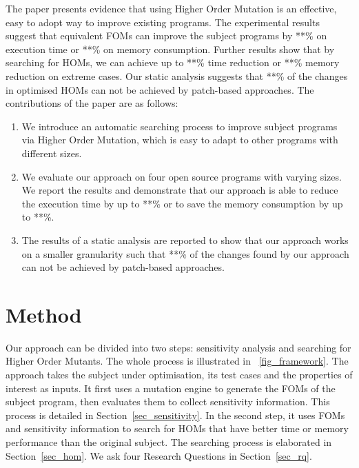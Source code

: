 \documentclass[oribibl]{llncs}
\begin{document}
The paper presents evidence that using Higher Order Mutation is an effective, easy to adopt way to improve existing programs. 
The experimental results suggest that equivalent FOMs can improve the subject programs by **\% on execution time or **\% on memory consumption.
Further results show that by searching for HOMs, we can achieve up to **\% time reduction or **\% memory reduction on extreme cases.
Our static analysis suggests that **\% of the changes in optimised HOMs can not be achieved by patch-based approaches.
The contributions of the paper are as follows:
\begin{enumerate}
\item We introduce an automatic searching process to improve subject programs via Higher Order Mutation, which is easy to adapt to other programs with different sizes.
\item We evaluate our approach on four open source programs with varying sizes. We report the results and demonstrate that our approach is able to reduce the execution time by up to **\% or to save the memory consumption by up to **\%.
\item The results of a static analysis are reported to show that our approach works on a smaller granularity such that **\% of the changes found by our approach can not be achieved by patch-based approaches.
\end{enumerate}


\section{Method}
\label{sec_method}

Our approach can be divided into two steps: sensitivity analysis and searching for Higher Order Mutants.
The whole process is illustrated in \figurename~\ref{fig_framework}.
The approach takes the subject under optimisation, its test cases and the properties of interest as inputs.
It first uses a mutation engine to generate the FOMs of the subject program, then evaluates them to collect sensitivity information.
This process is detailed in Section~\ref{sec_sensitivity}.
In the second step, it uses FOMs and sensitivity information to search for HOMs that have better time or memory performance than the original subject.
The searching process is elaborated in Section~\ref{sec_hom}.
We ask four Research Questions in Section~\ref{sec_rq}.
\end{document}
